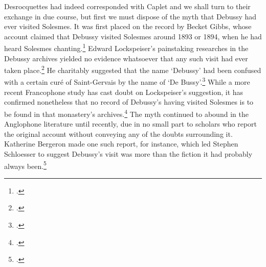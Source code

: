   {\cite[p.xii]{ApelGregorianChant1958}}
\noindent
Desrocquettes had indeed corresponded with Caplet and we shall turn to their exchange in due course, but first we must dispose of the myth that Debussy had ever visited Solesmes.
It was first placed on the record by Becket Gibbs, whose account claimed that Debussy visited Solesmes around 1893 or 1894, when he had heard Solesmes chanting.\footnote{\covid{}\cite[181--87]{dAlmendraModesgregoriensdans1950}.}
Edward Lockspeiser's painstaking researches in the Debussy archives yielded no evidence whatsoever that any such visit had ever taken place.\footcite[142]{LockspeiserNewLiteratureDebussy1959}
He charitably suggested that the name `Debussy' had been confused with a certain curé of Saint-Gervais by the name of `De Bussy'.\footcite[p.~171 n.~1]{LockspeiserDebussyHisLife1978}
While a more recent Francophone study has cast doubt on Lockspeiser's suggestion, it has confirmed nonetheless that no record of Debussy's having visited Solesmes is to be found in that monastery's archives.\footcite[10--19]{HalaSolesmesmusiciensannees2020}
The myth continued to abound in the Anglophone literature until recently, due in no small part to scholars who report the original account without conveying any of the doubts surrounding it.
Katherine Bergeron made one such report, for instance, which led Stephen Schloesser to suggest Debussy's visit was more than the fiction it had probably always been.\footcites[p.~168 n.~54]{BergeronDecadentEnchantmentsRevival1998}[See, for instance,][44 n.~53]{SchloesserVisionsAmenEarly2014}

